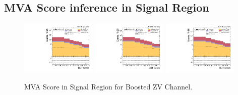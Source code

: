 \clearpage
\subsection{
  MVA Score inference in Signal Region
}

\begin{figure}[!ht]
  \centering
  \includegraphics[width=0.32\textwidth]{analysis_plots/2016_zv/sr_l/mva_score_zv_var2_log.pdf}
  \includegraphics[width=0.32\textwidth]{analysis_plots/2017_zv/sr_l/mva_score_zv_var2_log.pdf}
  \includegraphics[width=0.32\textwidth]{analysis_plots/2018_zv/sr_l/mva_score_zv_var2_log.pdf} \\
  \caption[MVA Score in Signal Region for Boosted ZV Channel]%
  {MVA Score in Signal Region for Boosted ZV Channel.}%
  \label{fig:zv-sr-l-mva-score}
\end{figure}

